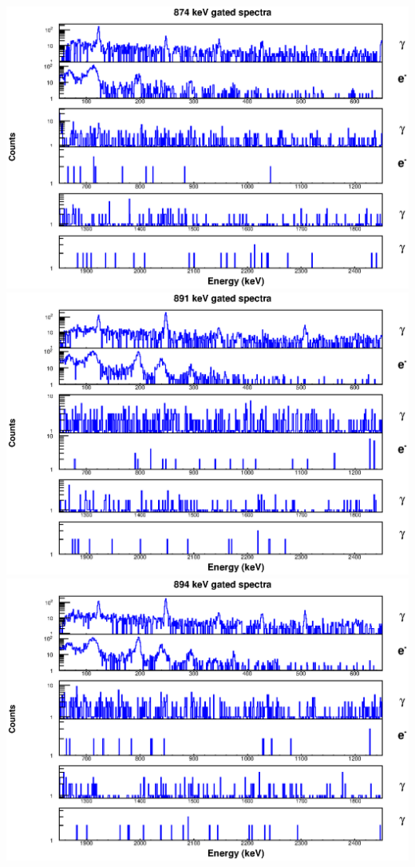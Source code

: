 \includegraphics[scale=0.8]{154Gd_Appendix/874_combined.eps}
\includegraphics[scale=0.8]{154Gd_Appendix/891_combined.eps}
\includegraphics[scale=0.8]{154Gd_Appendix/894_combined.eps}
